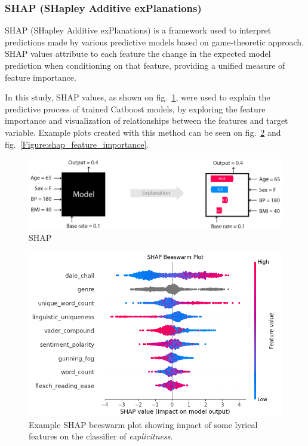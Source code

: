 \subsubsection*{SHAP (SHapley Additive exPlanations)}

SHAP (SHapley Additive exPlanations) is a framework used to interpret
predictions made by various predictive models based on game-theoretic approach.
SHAP values attribute to each feature the change in the expected model
prediction when conditioning on that feature, providing a unified measure
of feature importance.\cite{shap}

In this study, SHAP values, as shown on fig.~\ref{Figure:shap_intro}, were used to
explain the predictive process of trained Catboost models, by exploring the
feature importance and visualization of relationships between the features and
target variable. Example plots created with this method can be seen on
fig.~\ref{Figure:shap_beeswarm} and fig.~\ref{Figure:shap_feature_importance}.

\begin{center}
  \begin{figure}[H]
  \centering
  \includegraphics[width=6in]{img/shap_intro.png}
  \caption{SHAP}
  \label{Figure:shap_intro}
\end{figure}
\end{center}

\begin{center}
  \begin{figure}[H]
  \centering
  \includegraphics[width=6in]{img/shap_beeswarm.png}
  \caption{Example SHAP beeswarm plot showing impact of some lyrical features
  on the classifier of \textit{explicitness}.}
  \label{Figure:shap_beeswarm}
\end{figure}
\end{center}

